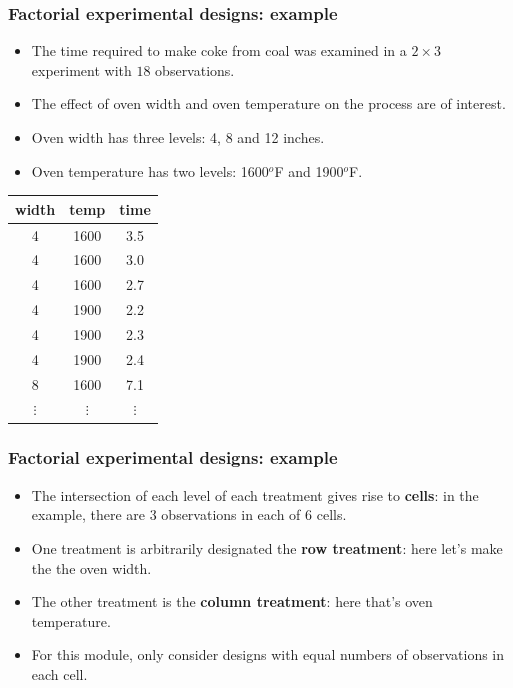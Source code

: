 \documentclass[12pt,xcolor=dvipsnames,handout,mathserif,aspectratio=169]{beamer}
\begin{document}
\begin{frame}
\frametitle{Factorial experimental designs: example}
\begin{itemize}
\item  The time required to make coke from coal was examined in a $2 \times 3$ experiment with $18$ observations.
\item The effect of oven width and oven temperature on the process are of interest.
\item Oven width has three levels: 4, 8 and 12 inches.
\item Oven temperature has two levels: 1600$^o$F and 1900$^o$F.
\end{itemize}
\small
\begin{center}
\begin{tabular}{ccc}\hline
width	&temp	&time\\\hline
4	&1600	&3.5\\
4	&1600	&3.0\\
4	&1600	&2.7\\\hline
4	&1900	&2.2\\
4	&1900	&2.3\\
4	&1900	&2.4\\\hline
8	&1600	&7.1\\
$\vdots$ &$\vdots$	&$\vdots$\\
\end{tabular}
\end{center}
\end{frame}

\begin{frame}
\frametitle{Factorial experimental designs: example}
\begin{itemize}
\item  The intersection of each level of each treatment gives rise to \textbf{cells}: in the example, there are 3 observations in each of 6 cells.
\vspace{0.3cm}
\item One treatment is arbitrarily designated the \textbf{row treatment}: here let's make the the oven width.
\vspace{0.3cm}
\item The other treatment is the \textbf{column treatment}: here that's oven temperature.
\vspace{0.3cm}
\item For this module, only consider designs with equal numbers of observations in each cell.
\end{itemize}
\end{frame}
\end{document}
